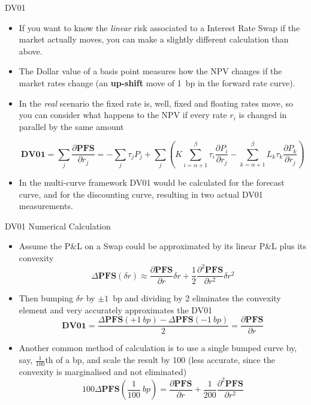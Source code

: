 \documentclass{beamer}
\begin{document}
\begin{frame}{DV01}
\begin{itemize}
\item<1-> If you want to know the \emph{linear} risk associated to a Interest Rate Swap if the market actually moves, you can make a slightly different calculation than above.
\item<2-> The \textcolor{maincolor}{Dollar value of a basis point} measures how the NPV changes if the market rates change (an \textbf{up-shift} move of 1~bp in the forward rate curve).
\item<3-> In the \emph{real} scenario the fixed rate is, well, fixed and floating rates move, so you can consider what happens to the NPV if every rate $r_i$ is changed in parallel by the same amount

\begin{equation*}
	\textbf{DV01} = \sum_j \frac{\partial \textbf{PFS}}{\partial r_j} = -\sum_{j}\tau_jP_j+\sum_{j}\left(K\sum_{i=\alpha+1}^\beta\tau_i\frac{\partial P_i}{\partial r_j} - \sum_{k=\alpha+1}^\beta L_k\tau_k\frac{\partial P_k}{\partial r_j}\right)
\end{equation*}
\item<4-> In the multi-curve framework DV01 would be calculated for the forecast curve, and for the discounting curve, resulting in two actual DV01 measurements.
\end{itemize}
\end{frame}

\begin{frame}{DV01 Numerical Calculation }
\begin{itemize}
\item<1-> Assume the P\&L on a Swap could be approximated by its linear P\&L plus its convexity
\begin{equation*}
	\Delta \textbf{PFS}(\delta r)\approx \frac{\partial \textbf{PFS} }{\partial r}\delta r + \frac{1}{2}\frac{\partial^2 \textbf{PFS}}{\partial r^2}\delta r^2
\end{equation*}
\item<2-> Then bumping $\delta r$ by $\pm 1$~bp and dividing by 2 eliminates the convexity element and very accurately approximates the DV01
\begin{equation*}
	\textbf{DV01} = \frac{\Delta \textbf{PFS}(+1~bp)-\Delta \textbf{PFS}(-1~bp)}{2}=\frac{\partial \textbf{PFS} }{\partial r}
\end{equation*}
\item<3-> Another common method of calculation is to use a single bumped curve by, say, $\frac{1}{100}$th of a bp, and scale the result by 100 (less accurate, since the convexity is marginalised and not eliminated)
\begin{equation*}
	100\Delta \textbf{PFS}\left(\frac{1}{100}~bp\right)=\frac{\partial \textbf{PFS}}{\partial r}+\frac{1}{200}\frac{\partial^2\textbf{PFS}}{\partial r^2}
\end{equation*}
\end{itemize}
\end{frame}
\end{document}
